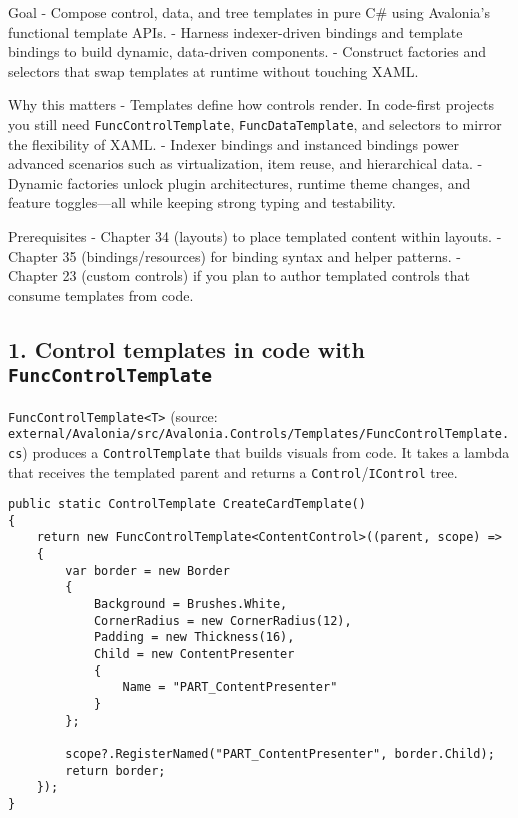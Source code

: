 Goal - Compose control, data, and tree templates in pure C\# using
Avalonia's functional template APIs. - Harness indexer-driven bindings
and template bindings to build dynamic, data-driven components. -
Construct factories and selectors that swap templates at runtime without
touching XAML.

Why this matters - Templates define how controls render. In code-first
projects you still need \passthrough{\lstinline!FuncControlTemplate!},
\passthrough{\lstinline!FuncDataTemplate!}, and selectors to mirror the
flexibility of XAML. - Indexer bindings and instanced bindings power
advanced scenarios such as virtualization, item reuse, and hierarchical
data. - Dynamic factories unlock plugin architectures, runtime theme
changes, and feature toggles---all while keeping strong typing and
testability.

Prerequisites - Chapter 34 (layouts) to place templated content within
layouts. - Chapter 35 (bindings/resources) for binding syntax and helper
patterns. - Chapter 23 (custom controls) if you plan to author templated
controls that consume templates from code.

\subsection{\texorpdfstring{1. Control templates in code with
\texttt{FuncControlTemplate}}{1. Control templates in code with FuncControlTemplate}}\label{control-templates-in-code-with-funccontroltemplate}

\passthrough{\lstinline!FuncControlTemplate<T>!} (source:
\passthrough{\lstinline!external/Avalonia/src/Avalonia.Controls/Templates/FuncControlTemplate.cs!})
produces a \passthrough{\lstinline!ControlTemplate!} that builds visuals
from code. It takes a lambda that receives the templated parent and
returns a
\passthrough{\lstinline!Control!}/\passthrough{\lstinline!IControl!}
tree.

\begin{lstlisting}
public static ControlTemplate CreateCardTemplate()
{
    return new FuncControlTemplate<ContentControl>((parent, scope) =>
    {
        var border = new Border
        {
            Background = Brushes.White,
            CornerRadius = new CornerRadius(12),
            Padding = new Thickness(16),
            Child = new ContentPresenter
            {
                Name = "PART_ContentPresenter"
            }
        };

        scope?.RegisterNamed("PART_ContentPresenter", border.Child);
        return border;
    });
}
\end{lstlisting}

